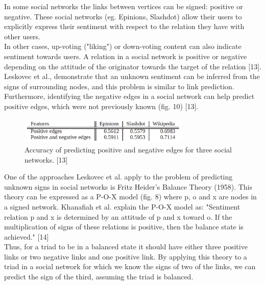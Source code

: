 \documentclass[conference,letterpaper]{IEEEtran}
\begin{document}
In some social networks the links between vertices can be signed: positive or negative. These social networks (eg. Epinions, Slashdot) allow their users to explicitly express their sentiment with respect to the relation they have with other users.\\
In other cases, up-voting ("liking") or down-voting content can also indicate sentiment towards users. A relation in a social network is positive or negative depending on the attitude of the originator towards the target of the relation [13]. Leskovec et al., demonstrate that an unknown sentiment can be inferred from the signs of surrounding nodes, and this problem is similar to link prediction.
Furthermore, identifying the negative edges in a social network can help predict positive edges, which were not previously known (fig. 10) [13]. \\

\begin{center}
\begin{figure}[hb]
\centering
\includegraphics[width=3.2in]{predicting_positive}
\caption{
Accuracy of predicting positive and negative edges for three social networks. [13]
}
\label{fig_sim}
\end{figure}
\end{center}

One of the approaches Leskovec et al. apply to the problem of predicting unknown signs in social networks is Fritz Heider's Balance Theory (1958). This theory can be expressed as a P-O-X model (fig. 8) where p, o and x are nodes in a signed network. Khanafiah et al. explain the P-O-X model as: "Sentiment relation p and x is determined by an attitude of p and x toward o. If the multiplication of signs of these relations is positive, then the balance state is achieved." [14] \\
Thus, for a triad to be in a balanced state it should have either three positive links or two negative links and one positive link. By applying this theory to a triad in a social network for which we know the signs of two of the links, we can predict the sign of the third, assuming the triad is balanced.\\
\end{document}
